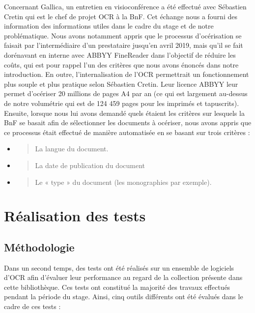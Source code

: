 \documentclass[a4paper,12pt,twoside]{book}
\begin{document}
	Concernant Gallica, un entretien en visioconférence a été effectué avec Sébastien Cretin qui est le chef de projet OCR à la BnF. Cet échange nous a fourni des information des informations utiles dans le cadre du stage et de notre problématique. Nous avons notamment appris que le processus d'océrisation se faisait par l'intermédiaire d'un prestataire jusqu'en avril 2019, mais qu'il se fait dorénavant en interne avec ABBYY FineReader dans l'objectif de réduire les coûts, qui est pour rappel l'un des critères que nous avons énoncés dans notre introduction. En outre, l'internalisation de l'OCR permettrait un fonctionnement plus souple et plus pratique selon Sébastien Cretin. Leur licence ABBYY leur permet d'océriser 20 millions de pages A4 par an (ce qui est largement au-dessus de notre volumétrie qui est de 124 459 pages pour les imprimés et tapuscrits). Ensuite, lorsque nous lui avons demandé quels étaient les critères sur lesquels la BnF se basait afin de sélectionner les documents à océriser, nous avons appris que ce processus était effectué de manière automatisée en se basant sur trois critères : \\
	
	\begin{itemize}
		\item
		\begin{quote}
			La langue du document.
		\end{quote}
		\item
		\begin{quote}
			La date de publication du document
		\end{quote}
		\item
		\begin{quote}
			Le « type » du document (les monographies par exemple).
		\end{quote}
	\end{itemize}
	
	
	
	
	\section{Réalisation des tests}
	
	\subsection{Méthodologie}
	
	Dans un second temps, des tests ont été réalisés sur un ensemble de
	logiciels d'OCR afin d'évaluer leur performance au regard de la
	collection présente dans cette bibliothèque. Ces tests ont constitué la
	majorité des travaux effectués pendant la période du stage. Ainsi, cinq
	outils différents ont été évalués dans le cadre de ces tests : \\
	
\end{document}
